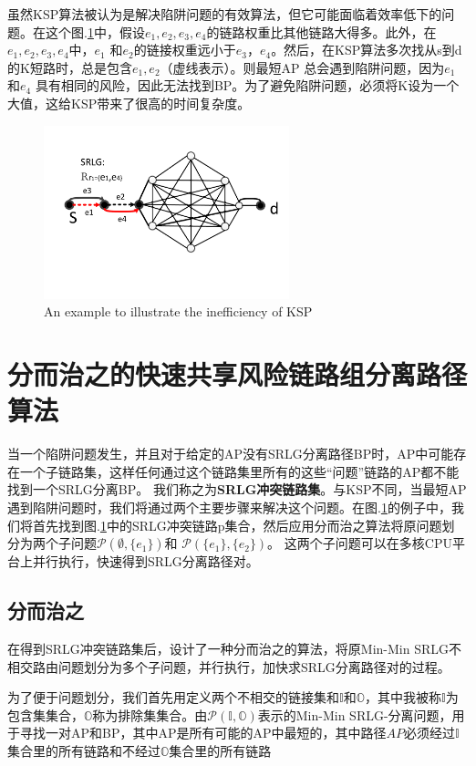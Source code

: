 虽然KSP算法被认为是解决陷阱问题的有效算法，但它可能面临着效率低下的问题。在这个图.\ref{fig:KSPproblem}中，假设$e_1, e_2, e_3, e_4$的链路权重比其他链路大得多。此外，在$e_1, e_2, e_3, e_4$中，$e_1$ 和$e_2$的链接权重远小于$e_3$，$e_4$。然后，在KSP算法多次找从s到d的K短路时，总是包含$e_1,e_2$（虚线表示）。则最短AP 总会遇到陷阱问题，因为$e_1$和$e_4$ 具有相同的风险，因此无法找到BP。为了避免陷阱问题，必须将K设为一个大值，这给KSP带来了很高的时间复杂度。
\begin{figure}[htbp]
\centering
\includegraphics[width=2.8in]{figures/KSPproblem}
  \caption{An example to illustrate the inefficiency of KSP}
  \label{fig:KSPproblem}
\end{figure}


\section{分而治之的快速共享风险链路组分离路径算法}
当一个陷阱问题发生，并且对于给定的AP没有SRLG分离路径BP时，AP中可能存在一个子链路集，这样任何通过这个链路集里所有的这些“问题”链路的AP都不能找到一个SRLG分离BP。 我们称之为\textbf{SRLG冲突链路集}。与KSP不同，当最短AP遇到陷阱问题时，我们将通过两个主要步骤来解决这个问题。在图.\ref{fig:KSPproblem}的例子中，我们将首先找到图.\ref{fig:KSPproblem}中的SRLG冲突链路p集合，然后应用分而治之算法将原问题划分为两个子问题$\mathcal{P}(\emptyset,\{e_1\})$和 $\mathcal{P}(\{e_1\},\{e_2\})$。 这两个子问题可以在多核CPU平台上并行执行，快速得到SRLG分离路径对。
\subsection{分而治之}
在得到SRLG冲突链路集后，设计了一种分而治之的算法，将原Min-Min SRLG不相交路由问题划分为多个子问题，并行执行，加快求SRLG分离路径对的过程。

为了便于问题划分，我们首先用定义两个不相交的链接集和$\mathbb{I}$和$\mathbb{O}$，其中我被称$\mathbb{I}$为包含集集合，$\mathbb{O}$称为排除集集合。由$\mathcal{P}({\mathbb{I},\mathbb{O}})$表示的Min-Min SRLG-分离问题，用于寻找一对AP和BP，其中AP是所有可能的AP中最短的，其中路径$AP$必须经过$\mathbb{I}$集合里的所有链路和不经过$\mathbb{O}$集合里的所有链路

